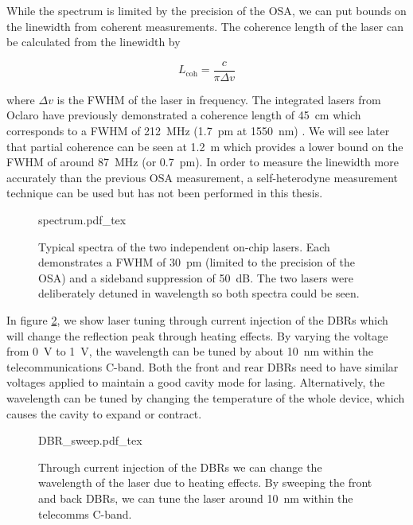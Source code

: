 While the spectrum is limited by the precision of the \ac{OSA}, we can put bounds on the linewidth from coherent measurements. The coherence length of the laser can be calculated from the linewidth by

\begin{equation}
	L_\text{coh} = \frac{c}{\pi\Delta v}
\end{equation}
\begin{parahigh}
where $\Delta v$ is the \ac{FWHM} of the laser in frequency. The integrated lasers from Oclaro have previously demonstrated a coherence length of \SI{45}{cm} which corresponds to a \ac{FWHM} of \SI{212}{MHz} (\SI{1.7}{pm} at \SI{1550}{nm}) \cite{Sibson2017InP}. We will see later that partial coherence can be seen at \SI{1.2}{\m} which provides a lower bound on the \ac{FWHM} of around \SI{87}{MHz} (or \SI{0.7}{pm}). In order to measure the linewidth more accurately than the previous \ac{OSA} measurement, a self-heterodyne measurement technique  \cite{self-heterodyne} can be used but has not been performed in this thesis. 
\end{parahigh}

\begin{figure}[t]
	\centering
	\small
	\def\svgwidth{0.8\textwidth} 
	{spectrum.pdf_tex}
	\caption[On-chip laser spectra]{Typical spectra of the two independent on-chip lasers. Each demonstrates a \ac{FWHM} of \SI{30}{pm} (limited to the precision of the \ac{OSA}) and a sideband suppression of \SI{50}{dB}. The two lasers were deliberately detuned in wavelength so both spectra could be seen.}
	\label{fig:spectra}
\end{figure}

In figure \ref{fig:DBR_sweep}, we show laser tuning through current injection of the \acp{DBR} which will change the reflection peak through heating effects. By varying the voltage from \SI{0}{\V} to \SI{1}{\V}, the wavelength can be tuned by about \SI{10}{\nm} within the telecommunications C-band. Both the front and rear \acp{DBR} need to have similar voltages applied to maintain a good cavity mode for lasing. Alternatively, the wavelength can be tuned by changing the temperature of the whole device, which causes the cavity to expand or contract. 

\begin{figure}[tp]
	\centering
	\small
	\def\svgwidth{0.9\textwidth} 
	{DBR_sweep.pdf_tex}
	\caption[Laser wavelength scan with DBR current injection]{Through current injection of the \acp{DBR} we can change the wavelength of the laser due to heating effects. By sweeping the front and back \acp{DBR}, we can tune the laser around \SI{10}{\nm} within the telecomms C-band.}
	\label{fig:DBR_sweep}
\end{figure}

